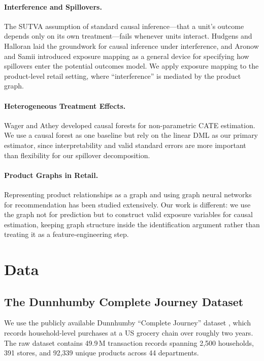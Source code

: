 \documentclass[conference]{IEEEtran}
\begin{document}
\paragraph{Interference and Spillovers.}
The SUTVA assumption of standard causal inference---that a unit's outcome
depends only on its own treatment---fails whenever units interact.
Hudgens and Halloran \cite{hudgens2008toward} laid the groundwork for
causal inference under interference, and Aronow and
Samii \cite{aronow2017estimating} introduced exposure mapping as a general
device for specifying how spillovers enter the potential outcomes model.
We apply exposure mapping to the product-level retail setting, where
``interference'' is mediated by the product graph.

\paragraph{Heterogeneous Treatment Effects.}
Wager and Athey \cite{wager2018estimation} developed causal forests for
non-parametric CATE estimation.
We use a causal forest as one baseline but rely on the linear DML as our
primary estimator, since interpretability and valid standard errors are more
important than flexibility for our spillover decomposition.

\paragraph{Product Graphs in Retail.}
Representing product relationships as a graph and using graph neural
networks for recommendation has been studied extensively.
Our work is different: we use the graph not for prediction but to construct
valid exposure variables for causal estimation, keeping graph structure
inside the identification argument rather than treating it as a
feature-engineering step.


\section{Data}

\subsection{The Dunnhumby Complete Journey Dataset}

We use the publicly available Dunnhumby ``Complete Journey''
dataset \cite{dunnhumby2020journey}, which records household-level
purchases at a US grocery chain over roughly two years.
The raw dataset contains 49.9\,M transaction records spanning 2,500
households, 391 stores, and 92,339 unique products across 44 departments.
\end{document}
